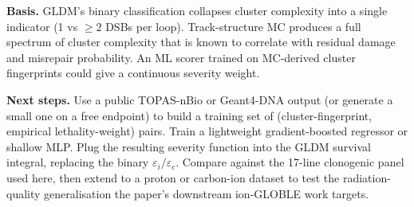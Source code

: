 \textbf{Basis.} GLDM's binary classification collapses cluster complexity
into a single indicator (1 vs $\geq 2$ DSBs per loop). Track-structure MC
produces a full spectrum of cluster complexity that is known to correlate
with residual damage and misrepair probability. An ML scorer trained on
MC-derived cluster fingerprints could give a continuous severity weight.

\textbf{Next steps.} Use a public TOPAS-nBio or Geant4-DNA output (or
generate a small one on a free endpoint) to build a training set of
(cluster-fingerprint, empirical lethality-weight) pairs. Train a lightweight
gradient-boosted regressor or shallow MLP. Plug the resulting severity
function into the GLDM survival integral, replacing the binary
$\varepsilon_i / \varepsilon_c$. Compare against the 17-line clonogenic
panel used here, then extend to a proton or carbon-ion dataset to test the
radiation-quality generalisation the paper's downstream ion-GLOBLE work
targets.
